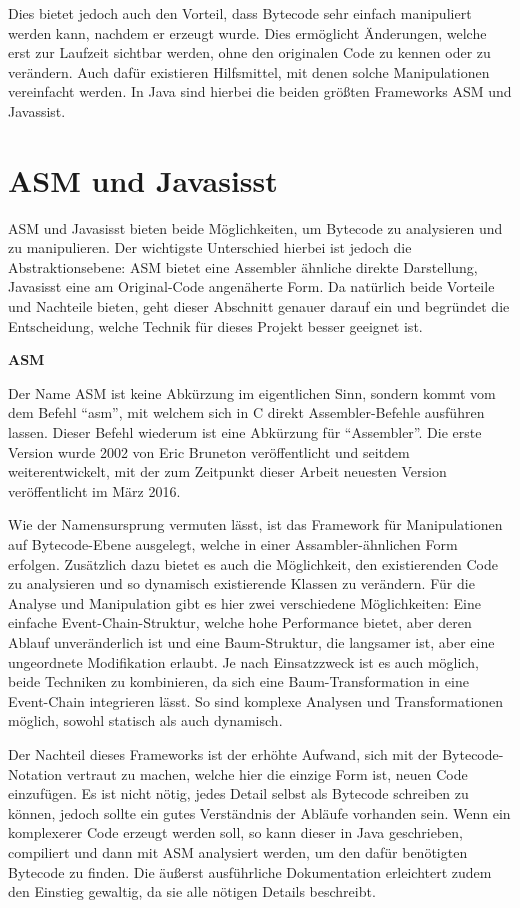 Dies bietet jedoch auch den Vorteil, dass Bytecode sehr einfach manipuliert werden kann, nachdem er erzeugt wurde. Dies ermöglicht Änderungen, welche erst zur Laufzeit sichtbar werden, ohne den originalen Code zu kennen oder zu verändern. Auch dafür existieren Hilfsmittel, mit denen solche Manipulationen vereinfacht werden. In Java sind hierbei die beiden größten Frameworks ASM und Javassist.

\section{ASM und Javasisst} 

ASM und Javasisst bieten beide Möglichkeiten, um Bytecode zu analysieren und zu manipulieren. Der wichtigste Unterschied hierbei ist jedoch die Abstraktionsebene: ASM bietet eine Assembler ähnliche direkte Darstellung, Javasisst eine am Original-Code angenäherte Form. Da natürlich beide Vorteile und Nachteile bieten, geht dieser Abschnitt genauer darauf ein und begründet die Entscheidung, welche Technik für dieses Projekt besser geeignet ist.

\textbf{ASM}

Der Name ASM ist keine Abkürzung im eigentlichen Sinn, sondern kommt vom dem Befehl "`asm"', mit welchem sich in C direkt Assembler-Befehle ausführen lassen. Dieser Befehl wiederum ist eine Abkürzung für "`Assembler"'. Die erste Version wurde 2002 von Eric Bruneton veröffentlicht und seitdem weiterentwickelt, mit der zum Zeitpunkt dieser Arbeit neuesten Version veröffentlicht im März 2016.

Wie der Namensursprung vermuten lässt, ist das Framework für Manipulationen auf Bytecode-Ebene ausgelegt, welche in einer Assambler-ähnlichen Form erfolgen. Zusätzlich dazu bietet es auch die Möglichkeit, den existierenden Code zu analysieren und so dynamisch existierende Klassen zu verändern. Für die Analyse und Manipulation gibt es hier zwei verschiedene Möglichkeiten: Eine einfache Event-Chain-Struktur, welche hohe Performance bietet, aber deren Ablauf unveränderlich ist und eine Baum-Struktur, die langsamer ist, aber eine ungeordnete Modifikation erlaubt.
Je nach Einsatzzweck ist es auch möglich, beide Techniken zu kombinieren, da sich eine Baum-Transformation in eine Event-Chain integrieren lässt. So sind komplexe Analysen und Transformationen möglich, sowohl statisch als auch dynamisch.

Der Nachteil dieses Frameworks ist der erhöhte Aufwand, sich mit der Bytecode-Notation vertraut zu machen, welche hier die einzige Form ist, neuen Code einzufügen. Es ist nicht nötig, jedes Detail selbst als Bytecode schreiben zu können, jedoch sollte ein gutes Verständnis der Abläufe vorhanden sein. Wenn ein komplexerer Code erzeugt werden soll, so kann dieser in Java geschrieben, compiliert und dann mit ASM analysiert werden, um den dafür benötigten Bytecode zu finden. Die äußerst ausführliche Dokumentation erleichtert zudem den Einstieg gewaltig, da sie alle nötigen Details beschreibt.

